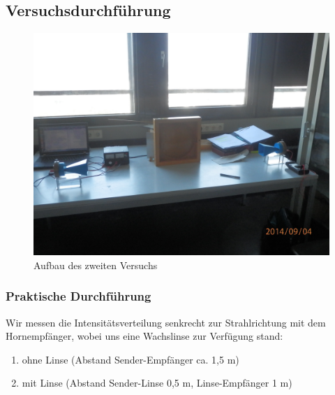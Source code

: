 \documentclass[12pt]{scrartcl}
\begin{document}
\subsection{Versuchsdurchführung}
\begin{figure}[H] 
  \centering
    \includegraphics[scale = 0.1]{a_2.JPG}
  	\caption[Aufbau des zweiten Versuchs]{Aufbau des zweiten Versuchs}
  \label{fig:a_2}
\end{figure}
\subsubsection{Praktische Durchführung}
Wir messen die Intensitätsverteilung senkrecht zur Strahlrichtung mit dem Hornempfänger, wobei uns eine Wachslinse zur Verfügung stand:
\begin{enumerate}
\item ohne Linse (Abstand Sender-Empfänger ca. 1,5 m)
\item mit Linse (Abstand Sender-Linse 0,5 m, Linse-Empfänger 1 m)
\end{enumerate}
\end{document}
